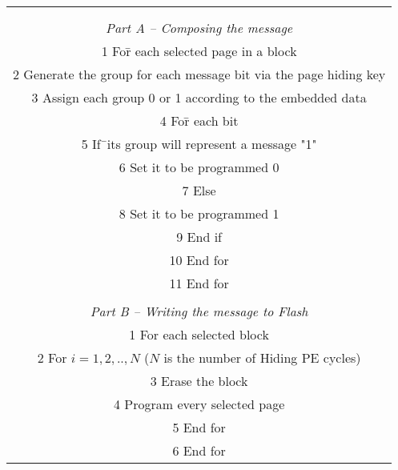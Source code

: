 
\begin{center}

\begin{tabular}{|c|}
\hline
\begin{minipage}[t]{3.2in}



\begin{tabbing}
{\bf Algorithm I: Encoding }
\\
\\\emph{Part A -- Composing the message}
\\ 1 Fo\=r each selected page in a block
\\ 2 \>Generate the group for each message bit via the page hiding key
\\ 3 \>Assign each group 0 or 1 according to the embedded data
\\ 4 \>Fo\=r each bit
\\ 5 \>\>If\=\ its group will represent a message "1"
\\ 6 \>\>\>      Set it to be programmed 0
\\ 7 \>\>    Else
\\ 8 \>\>\>      Set it to be programmed 1
\\ 9 \>\>   End if
\\10 \>End for
\\11 End for
\\
\\\emph{Part B -- Writing the message to Flash}	
\\1 For each selected block
\\2 \>  For $i=1,2,..,N$ ($N$ is the number of Hiding PE cycles)
\\3 \>\>  Erase the block
\\4 \>\> Program every selected page
\\5 \>End for
\\6 End for


\end{tabbing}
\end{minipage}
\\ \hline
\end{tabular}
\end{center}
